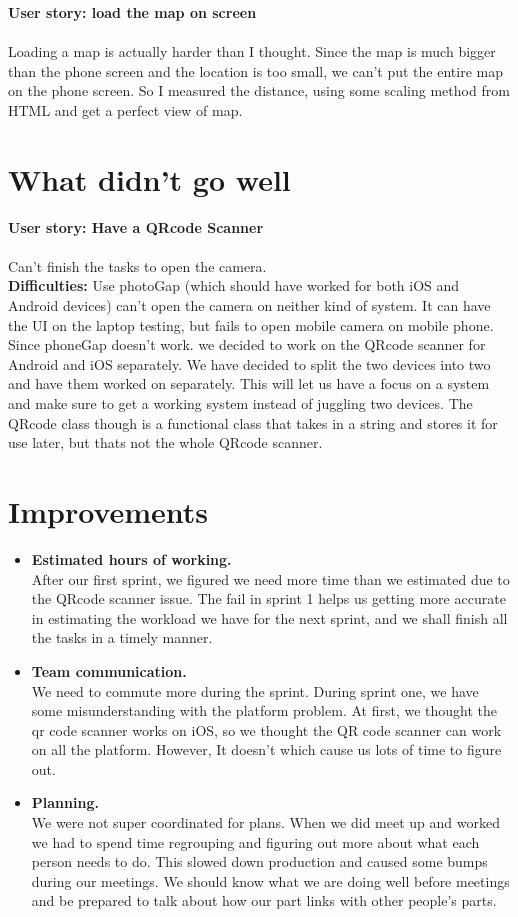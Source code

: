 \documentclass[12pt]{article}
\begin{document}
\textbf{User story: load the map on screen} \\ \\
Loading a map is actually harder than I thought. Since the map is much bigger than the phone screen and the location is too small, we can’t put the entire map on the phone screen. So I measured the distance, using some scaling method from HTML and get a perfect view of map. \\



\section{What didn't go well}


\textbf{User story: Have a QR­code Scanner} \\ \\
Can't finish the tasks to open the camera.  \\

\textbf{Difficulties: } Use photoGap (which should have worked for both iOS and Android devices) can’t open the camera on neither kind of system. It can have the UI on the laptop testing, but fails to open mobile camera on mobile phone. Since phoneGap doesn’t work. we decided to work on the QRcode scanner for Android and iOS separately.  We have decided to split the two devices into two and have them worked on separately. This will let us have a focus on a system and make sure to get a working system instead of juggling two devices. The QRcode class though is a functional class that takes in a string and stores it for use later, but thats not the whole QRcode scanner.

\section{Improvements}
\begin{itemize}
\item \textbf{Estimated hours of working.} \\
After our first sprint, we figured we need more time than we estimated due to the QRcode scanner issue. The fail in sprint 1 helps us getting more accurate in estimating the workload we have for the next sprint, and we shall finish all the tasks in a timely manner.

\item \textbf{Team communication.} \\
We need to commute more during the sprint. During sprint one, we have some misunderstanding with the platform problem. At first, we thought the qr code scanner works
on iOS, so we thought the QR code scanner can work on all the platform. However, It doesn't which cause us lots of time to figure out.

\item \textbf{Planning.} \\
We were not super coordinated for plans. When we did meet up and worked we had to spend time regrouping and figuring out more about what each person needs to do. This slowed down production and caused some bumps during our meetings. We should know what we are doing well before meetings and be prepared to talk about how our part links with other people’s parts.
\end{itemize}
\end{document}
